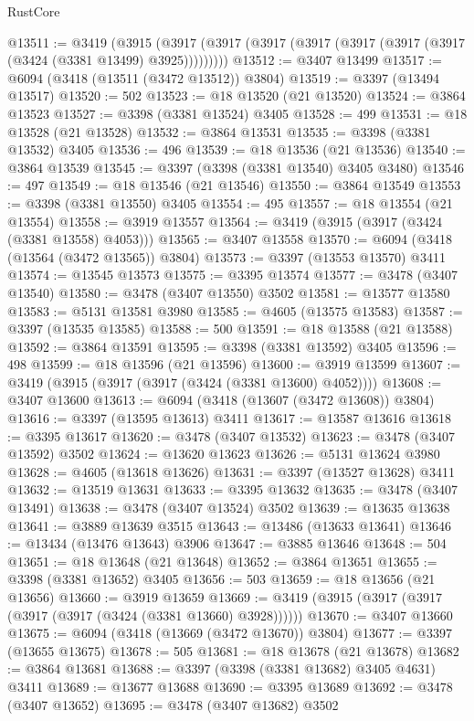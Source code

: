 \begin{lexlean}{RustCore}
\begin{coremodule}
@13511 := @3419
    (@3915 (@3917 (@3917 (@3917 (@3917 (@3917 (@3917 (@3917 (@3424 (@3381 @13499) @3925)))))))))
@13512 := @3407 @13499
@13517 := @6094 (@3418 (@13511 (@3472 @13512)) @3804)
@13519 := @3397 (@13494 @13517)
@13520 := 502
@13523 := @18 @13520 (@21 @13520)
@13524 := @3864 @13523
@13527 := @3398 (@3381 @13524) @3405
@13528 := 499
@13531 := @18 @13528 (@21 @13528)
@13532 := @3864 @13531
@13535 := @3398 (@3381 @13532) @3405
@13536 := 496
@13539 := @18 @13536 (@21 @13536)
@13540 := @3864 @13539
@13545 := @3397 (@3398 (@3381 @13540) @3405 @3480)
@13546 := 497
@13549 := @18 @13546 (@21 @13546)
@13550 := @3864 @13549
@13553 := @3398 (@3381 @13550) @3405
@13554 := 495
@13557 := @18 @13554 (@21 @13554)
@13558 := @3919 @13557
@13564 := @3419 (@3915 (@3917 (@3424 (@3381 @13558) @4053)))
@13565 := @3407 @13558
@13570 := @6094 (@3418 (@13564 (@3472 @13565)) @3804)
@13573 := @3397 (@13553 @13570) @3411
@13574 := @13545 @13573
@13575 := @3395 @13574
@13577 := @3478 (@3407 @13540)
@13580 := @3478 (@3407 @13550) @3502
@13581 := @13577 @13580
@13583 := @5131 @13581 @3980
@13585 := @4605 (@13575 @13583)
@13587 := @3397 (@13535 @13585)
@13588 := 500
@13591 := @18 @13588 (@21 @13588)
@13592 := @3864 @13591
@13595 := @3398 (@3381 @13592) @3405
@13596 := 498
@13599 := @18 @13596 (@21 @13596)
@13600 := @3919 @13599
@13607 := @3419 (@3915 (@3917 (@3917 (@3424 (@3381 @13600) @4052))))
@13608 := @3407 @13600
@13613 := @6094 (@3418 (@13607 (@3472 @13608)) @3804)
@13616 := @3397 (@13595 @13613) @3411
@13617 := @13587 @13616
@13618 := @3395 @13617
@13620 := @3478 (@3407 @13532)
@13623 := @3478 (@3407 @13592) @3502
@13624 := @13620 @13623
@13626 := @5131 @13624 @3980
@13628 := @4605 (@13618 @13626)
@13631 := @3397 (@13527 @13628) @3411
@13632 := @13519 @13631
@13633 := @3395 @13632
@13635 := @3478 (@3407 @13491)
@13638 := @3478 (@3407 @13524) @3502
@13639 := @13635 @13638
@13641 := @3889 @13639 @3515
@13643 := @13486 (@13633 @13641)
@13646 := @13434 (@13476 @13643) @3906
@13647 := @3885 @13646
@13648 := 504
@13651 := @18 @13648 (@21 @13648)
@13652 := @3864 @13651
@13655 := @3398 (@3381 @13652) @3405
@13656 := 503
@13659 := @18 @13656 (@21 @13656)
@13660 := @3919 @13659
@13669 := @3419 (@3915 (@3917 (@3917 (@3917 (@3917 (@3424 (@3381 @13660) @3928))))))
@13670 := @3407 @13660
@13675 := @6094 (@3418 (@13669 (@3472 @13670)) @3804)
@13677 := @3397 (@13655 @13675)
@13678 := 505
@13681 := @18 @13678 (@21 @13678)
@13682 := @3864 @13681
@13688 := @3397 (@3398 (@3381 @13682) @3405 @4631) @3411
@13689 := @13677 @13688
@13690 := @3395 @13689
@13692 := @3478 (@3407 @13652)
@13695 := @3478 (@3407 @13682) @3502

\end{coremodule}
\end{lexlean}
